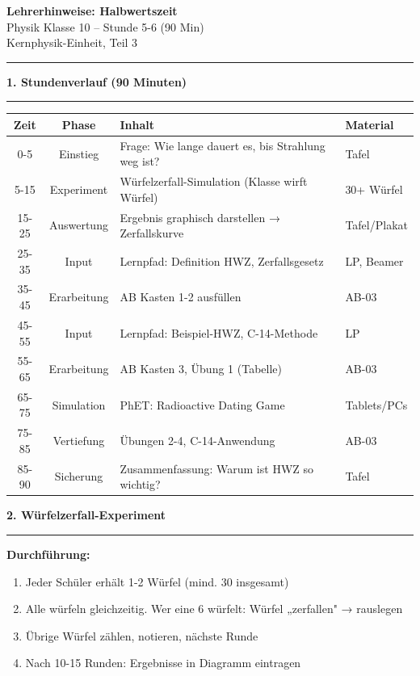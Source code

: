 \documentclass[11pt, a4paper]{article}
\newcommand{\abschnitt}[1]{%
    \vspace{10pt}\noindent\textbf{\textcolor{physik}{\large #1}}\vspace{6pt}\hrule\vspace{8pt}
}
\begin{document}
\begin{center}
{\LARGE\bfseries Lehrerhinweise: Halbwertszeit}\\[6pt]
{\large Physik Klasse 10 -- Stunde 5-6 (90 Min)}\\[4pt]
{\small\textcolor{grau}{Kernphysik-Einheit, Teil 3}}
\end{center}
\vspace{8pt}\hrule\vspace{12pt}

\abschnitt{1. Stundenverlauf (90 Minuten)}

\begin{tabularx}{\textwidth}{|c|c|X|l|}
\hline
\textbf{Zeit} & \textbf{Phase} & \textbf{Inhalt} & \textbf{Material} \\
\hline
0-5 & Einstieg & Frage: Wie lange dauert es, bis Strahlung weg ist? & Tafel \\
\hline
5-15 & Experiment & Würfelzerfall-Simulation (Klasse wirft Würfel) & 30+ Würfel \\
\hline
15-25 & Auswertung & Ergebnis graphisch darstellen → Zerfallskurve & Tafel/Plakat \\
\hline
25-35 & Input & Lernpfad: Definition HWZ, Zerfallsgesetz & LP, Beamer \\
\hline
35-45 & Erarbeitung & AB Kasten 1-2 ausfüllen & AB-03 \\
\hline
45-55 & Input & Lernpfad: Beispiel-HWZ, C-14-Methode & LP \\
\hline
55-65 & Erarbeitung & AB Kasten 3, Übung 1 (Tabelle) & AB-03 \\
\hline
65-75 & Simulation & PhET: Radioactive Dating Game & Tablets/PCs \\
\hline
75-85 & Vertiefung & Übungen 2-4, C-14-Anwendung & AB-03 \\
\hline
85-90 & Sicherung & Zusammenfassung: Warum ist HWZ so wichtig? & Tafel \\
\hline
\end{tabularx}

\vspace{12pt}

\abschnitt{2. Würfelzerfall-Experiment}

\textbf{Durchführung:}
\begin{enumerate}
\item Jeder Schüler erhält 1-2 Würfel (mind. 30 insgesamt)
\item Alle würfeln gleichzeitig. Wer eine 6 würfelt: Würfel „zerfallen" → rauslegen
\item Übrige Würfel zählen, notieren, nächste Runde
\item Nach 10-15 Runden: Ergebnisse in Diagramm eintragen
\end{enumerate}
\end{document}
